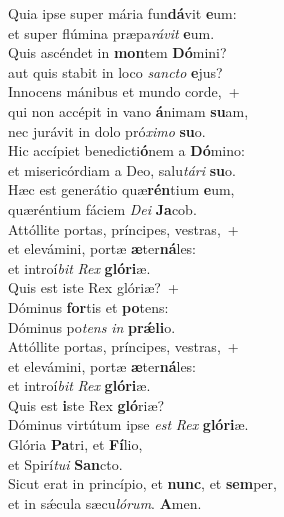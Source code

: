 \evenverse Quia ipse super mária fun\textbf{dá}vit \textbf{e}um:~\*\\
\evenverse et super flúmina præpa\textit{rá}\textit{vit} \textbf{e}um.\\
\oddverse Quis ascéndet in \textbf{mon}tem \textbf{Dó}mini?~\*\\
\oddverse aut quis stabit in loco \textit{san}\textit{cto} \textbf{e}jus?\\
\evenverse Innocens mánibus et mundo corde,~+\\
\evenverse  qui non accépit in vano \textbf{á}nimam \textbf{su}am,~\*\\
\evenverse nec jurávit in dolo pró\textit{xi}\textit{mo} \textbf{su}o.\\
\oddverse Hic accípiet benedicti\textbf{ó}nem a \textbf{Dó}mino:~\*\\
\oddverse et misericórdiam a Deo, salu\textit{tá}\textit{ri} \textbf{su}o.\\
\evenverse Hæc est generátio quæ\textbf{rén}tium \textbf{e}um,~\*\\
\evenverse quæréntium fáciem \textit{De}\textit{i} \textbf{Ja}cob.\\
\oddverse Attóllite portas, príncipes, vestras,~+\\
\oddverse  et elevámini, portæ \textbf{æ}ter\textbf{ná}les:~\*\\
\oddverse et introí\textit{bit} \textit{Rex} \textbf{gló}\textbf{ri}æ.\\
\evenverse Quis est iste Rex glóriæ?~+\\
\evenverse  Dóminus \textbf{for}tis et \textbf{po}tens:~\*\\
\evenverse Dóminus po\textit{tens} \textit{in} \textbf{prǽ}\textbf{li}o.\\
\oddverse Attóllite portas, príncipes, vestras,~+\\
\oddverse  et elevámini, portæ \textbf{æ}ter\textbf{ná}les:~\*\\
\oddverse et introí\textit{bit} \textit{Rex} \textbf{gló}\textbf{ri}æ.\\
\evenverse Quis est \textbf{i}ste Rex \textbf{gló}riæ?~\*\\
\evenverse Dóminus virtútum ipse \textit{est} \textit{Rex} \textbf{gló}\textbf{ri}æ.\\
\oddverse Glória \textbf{Pa}tri, et \textbf{Fí}lio,~\*\\
\oddverse et Spirí\textit{tu}\textit{i} \textbf{San}cto.\\
\evenverse Sicut erat in princípio, et \textbf{nunc}, et \textbf{sem}per,~\*\\
\evenverse et in sǽcula sæcu\textit{ló}\textit{rum}. \textbf{A}men.\\
